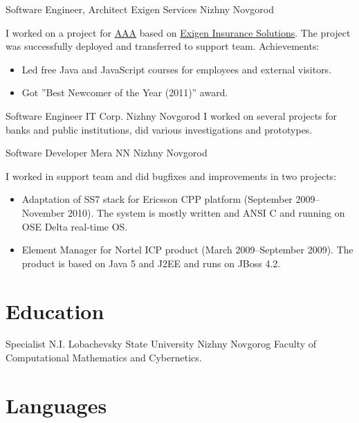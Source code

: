 \documentclass[11pt,a4paper,sans]{moderncv}
\begin{document}
{Software Engineer, Architect}
{Exigen Services}
{Nizhny Novgorod}
{}
{I worked on a project for
\href{http://www.aaa.com/PPInternational/International.html}{AAA}
based on
\href{http://www.exigeninsurance.com/business-solutions/overview.html}{Exigen Insurance Solutions}.
The project was successfully deployed and transferred to support team.
\newline{}
Achievements:
\begin{itemize}
\item Led free Java and JavaScript courses for employees and external
  visitors.
\item Got ''Best Newcomer of the Year (2011)'' award.
\end{itemize}
}

{Software Engineer}
{IT Corp.}
{Nizhny Novgorod}
{}
{I worked on several projects for banks and public institutions, did
various investigations and prototypes.
}

{Software Developer}
{Mera NN}
{Nizhny Novgorod}
{}
{I worked in support team and did bugfixes and improvements in two
projects:
\begin{itemize}
\item Adaptation of SS7 stack for Ericsson CPP platform (September
  2009--November 2010).  The system is mostly written and ANSI C and
  running on OSE Delta real-time OS.
\item Element Manager for Nortel ICP product (March 2009--September
  2009).  The product is based on Java 5 and J2EE and runs on JBoss
  4.2.
\end{itemize}
}

\section{Education}
{Specialist}
{N.I. Lobachevsky State University}
{Nizhny Novgorog}
{}
{Faculty of Computational Mathematics and Cybernetics.}

\section{Languages}
\end{document}
